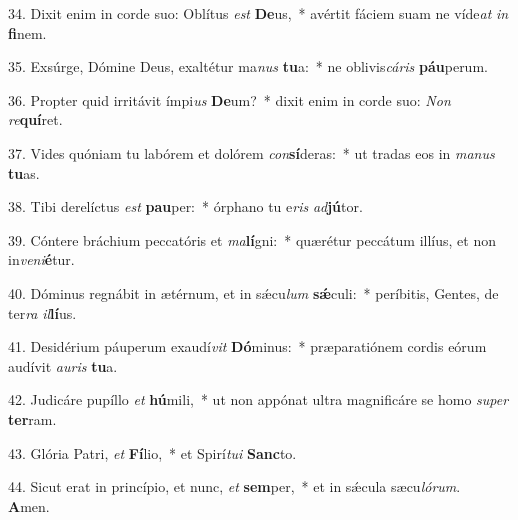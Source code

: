 34. Dixit enim in corde suo: Oblítus \textit{est} \textbf{De}us,~*  avértit fáciem suam ne víde\textit{at} \textit{in} \textbf{fi}nem.\

35. Exsúrge, Dómine Deus, exaltétur ma\textit{nus} \textbf{tu}a:~*  ne oblivis\textit{cá}\textit{ris} \textbf{páu}perum.\

36. Propter quid irritávit ímpi\textit{us} \textbf{De}um?~*  dixit enim in corde suo: \textit{Non} \textit{re}\textbf{quí}ret.\

37. Vides quóniam tu labórem et dolórem \textit{con}\textbf{sí}deras:~*  ut tradas eos in \textit{ma}\textit{nus} \textbf{tu}as.\

38. Tibi derelíctus \textit{est} \textbf{pau}per:~*  órphano tu e\textit{ris} \textit{ad}\textbf{jú}tor.\

39. Cóntere bráchium peccatóris et \textit{ma}\textbf{lí}gni:~*  quærétur peccátum illíus, et non in\textit{ve}\textit{ni}\textbf{é}tur.\

40. Dóminus regnábit in ætérnum, et in sǽcu\textit{lum} \textbf{sǽ}culi:~*  períbitis, Gentes, de ter\textit{ra} \textit{il}\textbf{lí}us.\

41. Desidérium páuperum exaudí\textit{vit} \textbf{Dó}minus:~*  præparatiónem cordis eórum audívit \textit{au}\textit{ris} \textbf{tu}a.\

42. Judicáre pupíllo \textit{et} \textbf{hú}mili,~*  ut non appónat ultra magnificáre se homo \textit{su}\textit{per} \textbf{ter}ram.\

43. Glória Patri, \textit{et} \textbf{Fí}lio,~*  et Spirí\textit{tu}\textit{i} \textbf{Sanc}to.\

44. Sicut erat in princípio, et nunc, \textit{et} \textbf{sem}per,~*  et in sǽcula sæcu\textit{ló}\textit{rum}. \textbf{A}men.\

